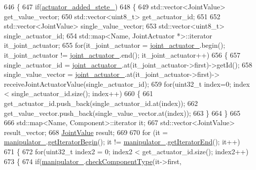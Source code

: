 \begin{DoxyCode}
646 \{
647   \textcolor{keywordflow}{if}(\hyperlink{classrobotis__manipulator_1_1_robotis_manipulator_a02073b7982b992642b28acfa35a17769}{actuator\_added\_stete\_})
648   \{
649     std::vector<JointValue> get\_value\_vector;
650     std::vector<uint8\_t> get\_actuator\_id;
651 
652     std::vector<JointValue> single\_value\_vector;
653     std::vector<uint8\_t> single\_actuator\_id;
654     std::map<Name, JointActuator *>::iterator it\_joint\_actuator;
655     \textcolor{keywordflow}{for}(it\_joint\_actuator = \hyperlink{classrobotis__manipulator_1_1_robotis_manipulator_a54dfb941bb2682d321daea25a373ab1c}{joint\_actuator\_}.begin(); it\_joint\_actuator != 
      \hyperlink{classrobotis__manipulator_1_1_robotis_manipulator_a54dfb941bb2682d321daea25a373ab1c}{joint\_actuator\_}.end(); it\_joint\_actuator++)
656     \{
657       single\_actuator\_id = \hyperlink{classrobotis__manipulator_1_1_robotis_manipulator_a54dfb941bb2682d321daea25a373ab1c}{joint\_actuator\_}.at(it\_joint\_actuator->first)->getId();
658       single\_value\_vector = \hyperlink{classrobotis__manipulator_1_1_robotis_manipulator_a54dfb941bb2682d321daea25a373ab1c}{joint\_actuator\_}.at(it\_joint\_actuator->first)->
      receiveJointActuatorValue(single\_actuator\_id);
659       \textcolor{keywordflow}{for}(uint32\_t index=0; index < single\_actuator\_id.size(); index++)
660       \{
661         get\_actuator\_id.push\_back(single\_actuator\_id.at(index));
662         get\_value\_vector.push\_back(single\_value\_vector.at(index));
663       \}
664     \}
665 
666     std::map<Name, Component>::iterator it;
667     std::vector<JointValue> result\_vector;
668     \hyperlink{structrobotis__manipulator_1_1_point}{JointValue} result;
669 
670     \textcolor{keywordflow}{for} (it = \hyperlink{classrobotis__manipulator_1_1_robotis_manipulator_a5b2df4a3b3ee7f408cb1d0eaf61644dc}{manipulator\_}.\hyperlink{classrobotis__manipulator_1_1_manipulator_a83e1adbb8c496ebf785311c8aab2b9ad}{getIteratorBegin}(); it != 
      \hyperlink{classrobotis__manipulator_1_1_robotis_manipulator_a5b2df4a3b3ee7f408cb1d0eaf61644dc}{manipulator\_}.\hyperlink{classrobotis__manipulator_1_1_manipulator_ae600869bf358724f53241eb5f061ea78}{getIteratorEnd}(); it++)
671     \{
672       \textcolor{keywordflow}{for}(uint32\_t index2 = 0; index2 < get\_actuator\_id.size(); index2++)
673       \{
674         \textcolor{keywordflow}{if}(\hyperlink{classrobotis__manipulator_1_1_robotis_manipulator_a5b2df4a3b3ee7f408cb1d0eaf61644dc}{manipulator\_}.\hyperlink{classrobotis__manipulator_1_1_manipulator_a5b1f27b9cc2875b4e0275e3b88ab1b28}{checkComponentType}(it->first,

\end{DoxyCode}
